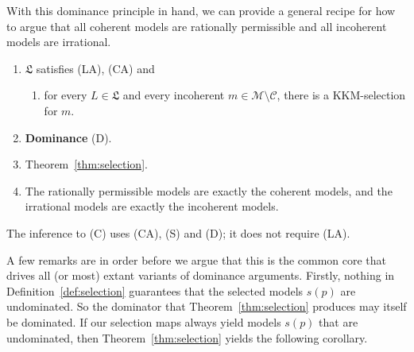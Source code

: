 \documentclass[11pt]{article}
\newcommand{\chg}[1]{{\color{red}#1}}
\theoremstyle{definition}
\theoremstyle{remark}
\newcommand{\M}{\mathcal M}
\newcommand{\C}{\mathcal C}
\newcommand{\U}{\mathcal U}
\newcommand{\Lf}{\mathfrak L}
\begin{document}



With this dominance principle in hand, we can provide a general recipe for how to argue that all coherent models are rationally permissible and all incoherent models are irrational.
\begin{enumerate}[label=\textbf{(P\arabic*)},leftmargin=*]
\item $\Lf$ satisfies (LA), (CA) and
\begin{enumerate}
\item[(S)]\label{condition:selection} for every $L\in\Lf$ and every incoherent $m\in\M\setminus\C$, there is a KKM-selection for $m$.
\end{enumerate}
\item \textbf{Dominance} (D).
\item Theorem~\ref{thm:selection}.
\item[\textbf{(C)}]\label{conclusion:complete-class} The rationally permissible models are exactly the coherent models, and the irrational models are exactly the incoherent models.
\end{enumerate}

\chg{The inference to (C) uses (CA), (S) and (D); it does not require (LA).}




A few remarks are in order before we argue that this is the common core that drives all (or most) extant variants of dominance arguments. Firstly, nothing in Definition~\ref{def:selection} guarantees that the selected models $s(p)$ are undominated. So the dominator that Theorem~\ref{thm:selection} produces may itself be dominated. If our selection maps always yield models $s(p)$ that are undominated, then Theorem~\ref{thm:selection} yields the following corollary.
\end{document}
